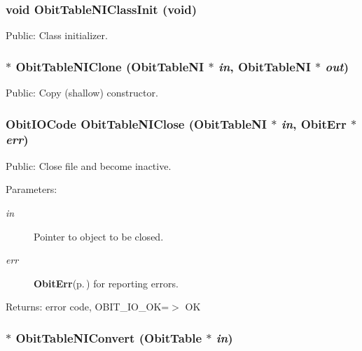 \subsubsection{\setlength{\rightskip}{0pt plus 5cm}void Obit\-Table\-NIClass\-Init (void)}\label{ObitTableNI_8h_a10}


Public: Class initializer. 

\subsubsection{$\ast$ Obit\-Table\-NIClone ({\bf Obit\-Table\-NI} $\ast$ {\em in}, {\bf Obit\-Table\-NI} $\ast$ {\em out})}\label{ObitTableNI_8h_a15}


Public: Copy (shallow) constructor. 

\subsubsection{\setlength{\rightskip}{0pt plus 5cm}Obit\-IOCode Obit\-Table\-NIClose ({\bf Obit\-Table\-NI} $\ast$ {\em in}, {\bf Obit\-Err} $\ast$ {\em err})}\label{ObitTableNI_8h_a21}


Public: Close file and become inactive. 

\begin{Desc}
\item[Parameters:]
\begin{description}
\item[{\em in}]Pointer to object to be closed. \item[{\em err}]{\bf Obit\-Err}{\rm (p.\,\pageref{structObitErr})} for reporting errors. \end{description}
\end{Desc}
\begin{Desc}
\item[Returns:]error code, OBIT\_\-IO\_\-OK=$>$ OK \end{Desc}
\subsubsection{$\ast$ Obit\-Table\-NIConvert ({\bf Obit\-Table} $\ast$ {\em in})}\label{ObitTableNI_8h_a16}


